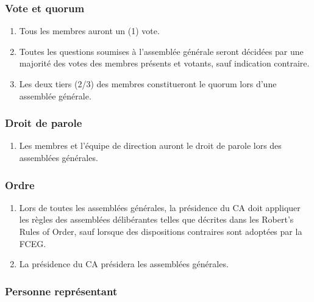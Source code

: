 \subsubsection{Vote et quorum}
\label{lignes-directrices-des-reunions-vote-et-quorum}

\begin{enumerate}
 \item Tous les membres auront un (1) vote.
 \item Toutes les questions soumises à l'assemblée générale seront décidées par une majorité des votes des membres présents et votants, sauf indication contraire.
 \item Les deux tiers (2/3) des membres constitueront le quorum lors d'une assemblée générale.
\end{enumerate}

\subsubsection{Droit de parole}
\label{lignes-directrices-des-reunions-droit-de-parole}

\begin{enumerate}
 \item Les membres et l'équipe de direction auront le droit de parole lors des assemblées générales.
\end{enumerate}

\subsubsection{Ordre}
\label{lignes-directrices-des-reunions-ordre}

\begin{enumerate}
 \item Lors de toutes les assemblées générales, la présidence du CA doit appliquer les règles des assemblées délibérantes telles que décrites dans les Robert’s Rules of Order, sauf lorsque des dispositions contraires sont adoptées par la FCEG.
 \item La présidence du CA présidera les assemblées générales.
\end{enumerate}

\subsubsection{Personne représentant}
\label{lignes-directrices-des-reunions-personne-representant}

